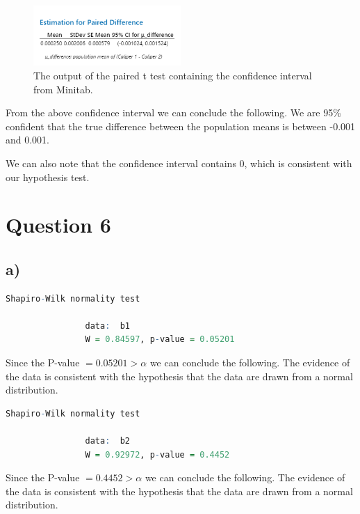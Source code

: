 \documentclass{article}
\begin{document}
\begin{figure}[h]
  \centering
  \includegraphics[width=0.5\textwidth]{./images/5_a.png}
  \caption{The output of the paired t test containing the confidence interval from Minitab.}
  \label{fig:5_a}
\end{figure}
From the above confidence interval we can conclude the following.
We are 95\% confident that the true difference between the population means is between -0.001 and 0.001.

We can also note that the confidence interval contains 0, which is consistent with our hypothesis test.

\clearpage
\section*{Question 6}

\subsection*{a)}
\begin{lstlisting}[language=R, caption=R output of Shapiro-Wilk test on Birth Order: 1, basicstyle=\small]
                Shapiro-Wilk normality test

                data:  b1
                W = 0.84597, p-value = 0.05201
\end{lstlisting}

Since the P-value $= 0.05201 > \alpha$ we can conclude the following.
    The evidence of the data is consistent with the hypothesis that the data are drawn from a normal distribution.



\begin{lstlisting}[language=R, caption=R output of Shapiro-Wilk test on Birth Order: 1, basicstyle=\small]
                Shapiro-Wilk normality test

                data:  b2
                W = 0.92972, p-value = 0.4452
\end{lstlisting}

Since the P-value $= 0.4452 > \alpha$ we can conclude the following.
    The evidence of the data is consistent with the hypothesis that the data are drawn from a normal distribution.
\end{document}
